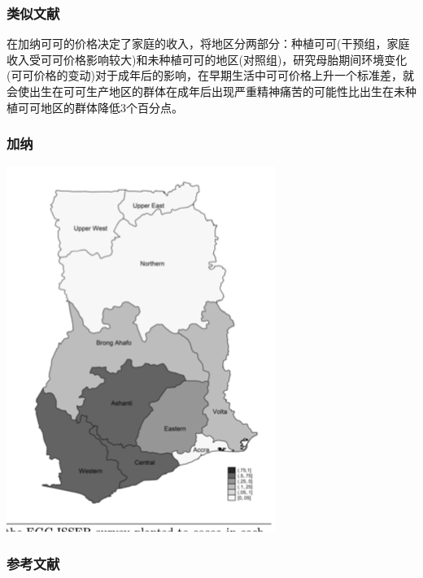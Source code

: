 \documentclass{beamer}
\begin{document}
\begin{frame}
\frametitle{类似文献}
 \citet{Adhvaryu2019}在加纳可可的价格决定了家庭的收入，将地区分两部分：种植可可(干预组，家庭收入受可可价格影响较大)和未种植可可的地区(对照组)，研究母胎期间环境变化(可可价格的变动)对于成年后的影响，在早期生活中可可价格上升一个标准差，就会使出生在可可生产地区的群体在成年后出现严重精神痛苦的可能性比出生在未种植可可地区的群体降低3个百分点。

\end{frame}
\begin{frame}
    \frametitle{加纳}
    \centering
    \includegraphics[scale=0.5]{ganna}
\end{frame}
\begin{frame}
    \frametitle{参考文献}


\end{frame}

\end{document}

